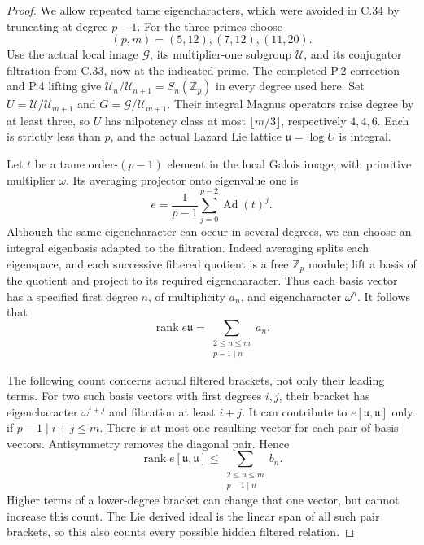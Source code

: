 \begin{proof}
We allow repeated tame eigencharacters, which were avoided
in C.34 by truncating at degree $p-1$.
For the three primes choose
\[
                 (p,m)=(5,12),(7,12),(11,20).
                                                               \tag{C37.2}
\]
Use the actual local image $\mathcal G$, its
multiplier-one subgroup $\mathcal U$, and its conjugator
filtration from C.33, now at the indicated prime.
The completed P.2 correction and P.4 lifting give
$\mathcal U_n/\mathcal U_{n+1}=S_n(\mathbb Z_p)$
in every degree used here.
Set $U=\mathcal U/\mathcal U_{m+1}$ and
$G=\mathcal G/\mathcal U_{m+1}$.
Their integral Magnus operators raise degree by at
least three, so $U$ has nilpotency class at most
$\lfloor m/3\rfloor$, respectively $4,4,6$.
Each is strictly less than $p$, and the actual
Lazard Lie lattice $\mathfrak u=\log U$ is integral.

Let $t$ be a tame order-$(p-1)$ element in the local
Galois image, with primitive multiplier $\omega$.
Its averaging projector onto eigenvalue one is
\[
                 e=\frac1{p-1}
                       \sum_{j=0}^{p-2}\operatorname{Ad}(t)^j .
\]
Although the same eigencharacter can occur in several
degrees, we can choose an integral eigenbasis adapted
to the filtration.  Indeed averaging splits each
eigenspace, and each successive filtered quotient
is a free $\mathbb Z_p$ module; lift a basis of the
quotient and project to its required eigencharacter.
Thus each basis vector has a specified first degree
$n$, of multiplicity $a_n$, and eigencharacter
$\omega^n$.
It follows that
\[
 \operatorname{rank}e\mathfrak u
        =\sum_{\substack{2\leq n\leq m\\p-1\mid n}}a_n.
                                                               \tag{C37.3}
\]

The following count concerns actual filtered brackets,
not only their leading terms.
For two such basis vectors with first degrees $i,j$,
their bracket has eigencharacter $\omega^{i+j}$
and filtration at least $i+j$.  It can contribute to
$e[\mathfrak u,\mathfrak u]$ only if
$p-1\mid i+j\leq m$.
There is at most one resulting vector for each pair
of basis vectors.  Antisymmetry removes the diagonal
pair.  Hence
\[
 \operatorname{rank}e[\mathfrak u,\mathfrak u]
       \leq\sum_{\substack{2\leq n\leq m\\p-1\mid n}}b_n.
                                                               \tag{C37.4}
\]
Higher terms of a lower-degree bracket can change
that one vector, but cannot increase this count.
The Lie derived ideal is the linear span of all
such pair brackets, so this also counts every
possible hidden filtered relation.


\end{proof}
